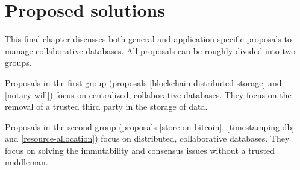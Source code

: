 \chapter{Proposed solutions}

\iffalse
- general introduction of the several propsed methods, maybe putting them in two categories
\fi

This final chapter discusses both general and application-specific proposals to manage collaborative databases. All proposals can be roughly divided into two groups. 

Proposals in the first group (proposals \ref{blockchain-distributed-storage} and \ref{notary-will}) focus on centralized, collaborative databases. They focus on the removal of a trusted third party in the storage of data.

Proposals in the second group (proposals \ref{store-on-bitcoin}, \ref{timestamping-db} and \ref{resource-allocation}) focus on distributed, collaborative databases. They focus on solving the immutability and consensus issues without a trusted middleman. 


\newpage

\newpage

\newpage

\newpage

\newpage

\iffalse
other examples to discuss:

- resource allocation system based on namecoin
\fi